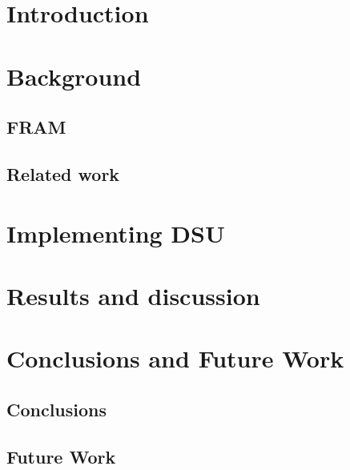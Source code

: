 \documentclass[a4paper, 11pt]{report}
\begin{document}



\setcounter{page}{2}
\tableofcontents
\newpage
\begin{abstract}

\end{abstract}

\chapter{Introduction}



\chapter{Background}

\section{FRAM}\label{sec:fram}

\section{Related work}\label{sec:rel_work}



\chapter{Implementing DSU}


\chapter{Results and discussion}


\chapter{Conclusions and Future Work}
\section{Conclusions}\label{sec:conclusions}


\section{Future Work}\label{sec:future_work}


\printbibliography
\end{document}
